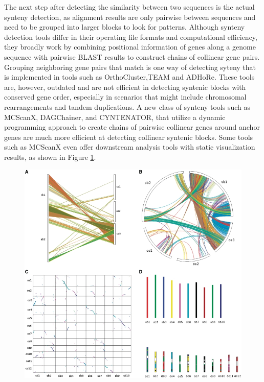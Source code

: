 The next step after detecting the similarity between two sequences is the actual synteny detection, as alignment results are only pairwise between sequences and need to be grouped into larger blocks to look for patterns. Although synteny detection tools differ in their operating file formats and computational efficiency, they broadly work by combining positional information of genes along a genome sequence with pairwise BLAST results to construct chains of collinear gene pairs. Grouping neighboring gene pairs that match is one way of detecting syteny\cite{wang2012mcscanx} that is implemented in tools such as OrthoCluster\cite{zeng2008orthocluster},TEAM\cite{luc2003gene} and ADHoRe\cite{proost2011adhore}. These tools are, however, outdated and are not efficient in detecting syntenic blocks with conserved gene order, especially in scenarios that might include chromosomal rearrangements and tandem duplications\cite{wang2012mcscanx}. A new class of synteny tools such as MCScanX\cite{wang2012mcscanx}, DAGChainer\cite{haas2004dagchainer}, and CYNTENATOR\cite{rodelsperger2010cyntenator}, that utilize a dynamic programming approach to create chains of pairwise collinear genes around anchor genes are much more efficient at detecting collinear syntenic blocks. Some tools such as MCScanX even offer downstream analysis tools with static visualization results, as shown in Figure \ref{fig:ch_2_synteny_plots}.     

\begin{figure}
  \centering
  \includegraphics[width=.75\linewidth]{images/ch_2_synteny_plots.jpg}
  \label{fig:ch_2_synteny_plots}
\end{figure}

